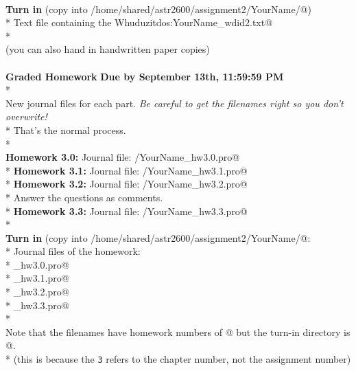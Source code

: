 \documentclass{article}
\newcommand{\hmwkDueDate}{September 13th, 11:59:59 PM}
\begin{document}
\begin{spacing}{1.0}
 ~\\ 
 \textrm{\textrm{\textbf{Turn in}}}\textrm{ (copy into }\verb@/home/shared/astr2600/assignment2/YourName/@\textrm{)}\\* 
 Text file containing the Whuduzitdos:\verb@ YourName_wdid2.txt@\\* 
 ~\\ 
 (you can also hand in handwritten paper copies)
 ~\\ 
 ~\\ 
 \newpage \textbf{Graded Homework}\textbf{    }\textbf{Due by \hmwkDueDate}\\* 
 ~\\ 
 New journal files for each part.  \emph{Be careful to get the filenames right so you don’t overwrite!}\\* 
 That’s the normal process.\\* 
 ~\\ 
 \textrm{\textrm{\textbf{Homework 3.0:}}}\textrm{  }\textrm{Journal file: }/YourName_hw3.0.pro@\\* 
 \textrm{\textrm{\textbf{Homework 3.1:}}}\textrm{  }\textrm{Journal file: }/YourName_hw3.1.pro@\\* 
 \textrm{\textrm{\textbf{Homework 3.2:}}}\textrm{  }\textrm{Journal file: }/YourName_hw3.2.pro@\\* 
   Answer the questions as comments.\\* 
 \textrm{\textrm{\textbf{Homework 3.3:}}}\textrm{  }\textrm{Journal file: }/YourName_hw3.3.pro@\\* 
 ~\\ 
 \textrm{\textrm{\textbf{Turn in}}}\textrm{ (copy into }\verb@/home/shared/astr2600/assignment2/YourName/@\textrm{:}\\* 
 Journal files of the homework:\\* 
 \verb@YourName_hw3.0.pro@\\* 
 \verb@YourName_hw3.1.pro@\\* 
 \verb@YourName_hw3.2.pro@\\* 
 \verb@YourName_hw3.3.pro@\\* 
 ~\\ 
 Note that the filenames have homework numbers of @ but the turn-in directory is @.\\* 
 (this is because the \verb|3| refers to the chapter number, not the assignment number)
 ~\\ 
 ~\\ 
 ~\\ 
 
 
 \end{spacing}
 
\end{document}
